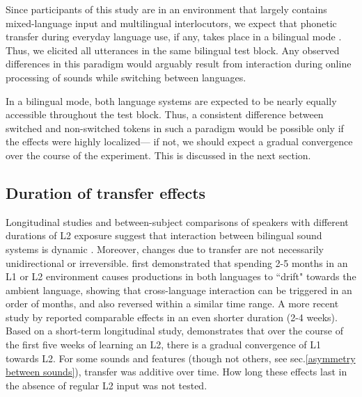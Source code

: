 \documentclass[12 pt]{article}
\begin{document}
Since participants of this study are in an environment that largely contains mixed-language input and multilingual interlocutors, we expect that phonetic transfer during everyday language use, if any, takes place in a bilingual mode \citep[see][]{grosjean1998studying}. Thus, we elicited all utterances in the same bilingual test block. Any observed differences in this paradigm would arguably result from interaction during online processing of sounds while switching between languages. 

In a bilingual mode, both language systems are expected to be nearly equally accessible throughout the test block. Thus, a consistent difference between switched and non-switched tokens in such a paradigm would be possible only if the effects were highly localized--- if not, we should expect a gradual convergence over the course of the experiment. This is discussed in the next section.


\subsection{Duration of transfer effects} \label{duration}

Longitudinal studies and between-subject comparisons of speakers with different durations of L2 exposure suggest that interaction between bilingual sound systems is dynamic \citep[e.g.][]{bohn1992production}. Moreover, changes due to transfer are not necessarily unidirectional or irreversible. \cite[][VOT]{sancier1997gestural} first demonstrated that spending 2-5 months in an L1 or L2 environment causes productions in both languages to ``drift" towards the ambient language, showing that cross-language interaction can be triggered in an order of months, and also reversed within a similar time range. A more recent study by \cite[][VOT]{tobin2017phonetic} reported comparable effects in an even shorter duration (2-4 weeks). Based on a short-term longitudinal study, \cite[][VOT]{chang2012rapid} demonstrates that over the course of the first five weeks of learning an L2, there is a gradual convergence of L1 towards L2. For some sounds and features (though not others, see sec.\ref{asymmetry between sounds}), transfer was additive over time. How long these effects last in the absence of regular L2 input was not tested. 
\end{document}
